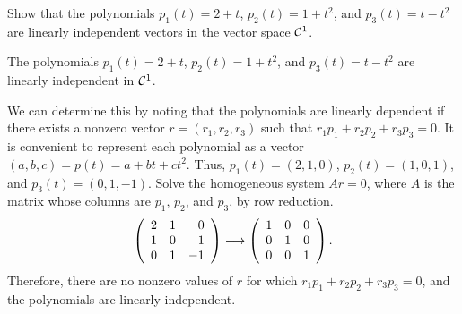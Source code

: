 \documentclass{ximera}
\begin{document}
\begin{exercise} \label{c5.4.5}
Show that the polynomials $p_1(t) = 2+t$, $p_2(t) = 1+t^2$, and
$p_3(t) = t-t^2$ are linearly independent vectors in the vector
space ${\cal C}^1$.

\begin{solution}

\ans The polynomials $p_1(t) = 2 + t$, $p_2(t) = 1 + t^2$, and $p_3(t) =
t - t^2$ are linearly independent in ${\cal C}^1$.  

\soln We can determine this
by noting that the polynomials are linearly dependent if there exists
a nonzero vector $r = (r_1,r_2,r_3)$ such that $r_1p_1 + r_2p_2 +
r_3p_3 = 0$.  It is convenient to represent each polynomial as a
vector $(a,b,c) = p(t) = a + bt + ct^2$.  Thus, $p_1(t) = (2,1,0)$, 
$p_2(t) = (1,0,1)$, and $p_3(t) = (0,1,-1)$.  Solve the homogeneous
system $Ar = 0$, where $A$ is the matrix whose columns are $p_1$,
$p_2$, and $p_3$, by row reduction.
\[ \left(\begin{array}{rrr} 2 & 1 & 0 \\ 1 & 0 & 1 \\ 0 & 1 & -1\end{array}\right) \longrightarrow
\left(\begin{array}{rrr} 1 & 0 & 0 \\ 0 & 1 & 0 \\ 0 & 0 & 1\end{array}\right). \]
Therefore, there are no nonzero values of $r$ for which $r_1p_1 + 
r_2p_2 + r_3p_3 = 0$, and the polynomials are linearly independent.


\end{solution}
\end{exercise}
\end{document}
